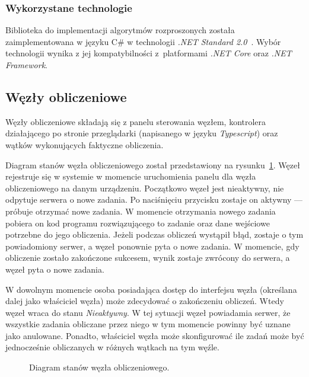 \documentclass[a4paper,11pt,twoside]{report}
\theoremstyle{definition}
\begin{document}
\subsubsection{Wykorzystane technologie}
Biblioteka do implementacji algorytmów rozproszonych została zaimplementowana w języku C\# w technologii \textit{.NET Standard 2.0}~\cite{dotnet-standard}. Wybór technologii wynika z jej kompatybilności z~platformami \textit{.NET Core} oraz \textit{.NET Framework}.

\subsection{Węzły obliczeniowe}

Węzły obliczeniowe składają się z panelu sterowania węzłem, kontrolera działającego po stronie przeglądarki (napisanego w języku \textit{Typescript}) oraz wątków wykonujących faktyczne obliczenia.

Diagram stanów węzła obliczeniowego został przedstawiony na rysunku~\ref{node-state}. Węzeł rejestruje się w systemie w momencie uruchomienia panelu dla węzła obliczeniowego na danym urządzeniu.
Początkowo węzeł jest nieaktywny, nie odpytuje serwera o nowe zadania.
Po naciśnięciu przycisku zostaje on aktywny --- próbuje otrzymać nowe zadania.
W momencie otrzymania nowego zadania pobiera on kod programu rozwiązującego to zadanie oraz dane wejściowe potrzebne do jego obliczenia. Jeżeli podczas obliczeń wystąpił błąd, zostaje o tym powiadomiony serwer, a węzeł ponownie pyta o nowe zadania.
W momencie, gdy obliczenie zostało zakończone sukcesem, wynik zostaje zwrócony do serwera, a węzeł pyta o nowe zadania.

W dowolnym momencie osoba posiadająca dostęp do interfejsu węzła (określana dalej jako właściciel węzła) może zdecydować o zakończeniu obliczeń. Wtedy węzeł wraca do stanu \textit{Nieaktywny}. W tej sytuacji węzeł powiadamia serwer, że wszystkie zadania obliczane przez niego w tym momencie powinny być uznane jako anulowane.
Ponadto, właściciel węzła może skonfigurować ile zadań może być jednocześnie obliczanych w różnych wątkach na tym węźle.

\begin{figure} 
    \caption{Diagram stanów węzła obliczeniowego.}
    \label{node-state}
\end{figure}
\end{document}
